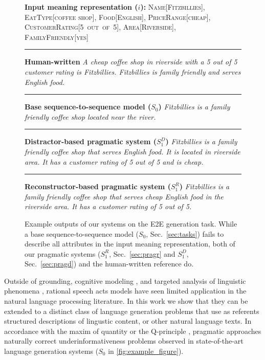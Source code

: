 \documentclass[11pt,a4paper]{article}
\newcommand{\basespk}[0]{$S_0$\xspace}
\newcommand{\pragd}[0]{$S_1^D$\xspace}
\newcommand{\pragr}[0]{$S_1^R$\xspace}
\begin{document}
\begin{figure}[t]
\begin{boxedminipage}{\columnwidth}
\scriptsize
\textbf{Input meaning representation ($i$):}
\newline
\textsc{Name[Fitzbillies], EatType[coffee shop],  Food[English], PriceRange[cheap], CustomerRating[5~out~of~5], Area[Riverside], FamilyFriendly[yes]}
\newline \rule{\columnwidth}{1.2pt}
\textbf{Human-written}
\newline
\emph{A cheap coffee shop in riverside with a 5 out of 5 customer rating is Fitzbillies. Fitzbillies is family friendly and serves English food.}
\newline \rule{\columnwidth}{0.4pt}
\textbf{Base sequence-to-sequence model ($S_0$)}
\newline
\emph{Fitzbillies is a family friendly coffee shop located near the river.}
\newline \rule{\columnwidth}{0.4pt}
\textbf{Distractor-based pragmatic system ($S^D_1$)}
\newline
\emph{Fitzbillies is a family friendly coffee shop that serves English food. It is located in riverside area. It has a customer rating of 5 out of 5 and is cheap.}
\newline \rule{\columnwidth}{0.4pt}
\textbf{Reconstructor-based pragmatic system ($S^R_1$)}
\newline
\emph{Fitzbillies is a family friendly coffee shop that serves cheap English food in the riverside area. It has a customer rating of 5 out of 5.}
\end{boxedminipage}
\caption{
\label{fig:example_figure}
Example outputs of our systems on the E2E generation task. While a base sequence-to-sequence model (\basespk, Sec.\ \ref{sec:tasks}) fails to describe all attributes in the input meaning representation, both of our pragmatic systems (\pragr, Sec.\ \ref{sec:pragr} and \pragd, Sec.\ \ref{sec:pragd}) and the human-written reference do.
\vspace{-1em}
}
\end{figure}


 
Outside of grounding, cognitive modeling \cite{Frank09PragmaticExperiments}, and targeted analysis of linguistic phenomena \cite{orita2015discourse}, rational speech acts models have seen limited application in the natural language processing
literature. In this work we show that they can be extended to a distinct class
of language generation problems that use as referents structured descriptions 
of lingustic content, or other natural language texts.
In accordance with the maxim of quantity \cite{Grice70Conversation} or the Q-principle \cite{Horn84Taxonomy},
pragmatic approaches naturally correct underinformativeness problems 
observed in state-of-the-art language generation systems ($S_0$ in \autoref{fig:example_figure}).
\end{document}
